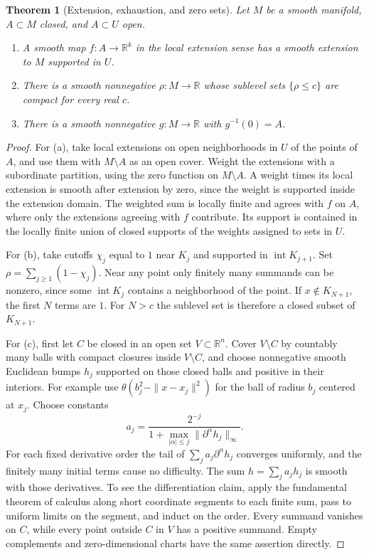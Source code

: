 \documentclass[11pt,oneside,openany]{book}
\newtheorem{theorem}{Theorem}[chapter]
\theoremstyle{definition}
\theoremstyle{remark}
\newcommand{\R}{\mathbb R}
\begin{document}
\begin{theorem}[Extension, exhaustion, and zero sets]\label{p104:M01.07}
Let \(M\) be a smooth manifold, \(A\subset M\) closed, and
\(A\subset U\) open.
\begin{enumerate}[label=\textup{(\alph*)}]
\item A smooth map \(f:A\to\R^k\) in the local extension sense has
  a smooth extension to \(M\) supported in \(U\).
\item There is a smooth nonnegative \(\rho:M\to\R\) whose sublevel
  sets \(\{\rho\leq c\}\) are compact for every real \(c\).
\item There is a smooth nonnegative \(g:M\to\R\) with
  \(g^{-1}(0)=A\).
\end{enumerate}
\end{theorem}

\begin{proof}
For (a), take local extensions on open neighborhoods in \(U\)
of the points of \(A\), and use them with \(M\setminus A\) as an
open cover. Weight the extensions with a subordinate partition,
using the zero function on \(M\setminus A\). A weight times its
local extension is smooth after extension by zero, since the
weight is supported inside the extension domain. The weighted
sum is locally finite and agrees with \(f\) on \(A\), where only
the extensions agreeing with \(f\) contribute. Its support is
contained in the locally finite union of closed supports of the
weights assigned to sets in \(U\).

For (b), take cutoffs \(\chi_j\) equal to \(1\) near \(K_j\)
and supported in \(\operatorname{int}K_{j+1}\). Set
\(\rho=\sum_{j\geq1}(1-\chi_j)\). Near any point only finitely
many summands can be nonzero, since some
\(\operatorname{int}K_j\) contains a neighborhood of the point.
If \(x\notin K_{N+1}\), the first \(N\) terms are \(1\).
For \(N>c\) the sublevel set is therefore a closed subset of
\(K_{N+1}\).

For (c), first let \(C\) be closed in an open set
\(V\subset\R^n\). Cover \(V\setminus C\) by countably many balls
with compact closures inside \(V\setminus C\), and choose
nonnegative smooth Euclidean bumps \(h_j\) supported on those
closed balls and positive in their interiors. For example use
\(\theta(b_j^2-\|x-x_j\|^2)\) for the ball of radius \(b_j\)
centered at \(x_j\). Choose constants
\[
 a_j=\frac{2^{-j}}{1+
   \max_{|\alpha|\leq j}\|\partial^\alpha h_j\|_\infty}.
\]
For each fixed derivative order the tail of
\(\sum_j a_j\partial^\alpha h_j\) converges uniformly, and the
finitely many initial terms cause no difficulty. The sum
\(h=\sum_j a_jh_j\) is smooth with those derivatives. To see
the differentiation claim, apply the fundamental theorem of
calculus along short coordinate segments to each finite sum,
pass to uniform limits on the segment, and induct on the order.
Every summand vanishes on \(C\), while every point outside \(C\)
in \(V\) has a positive summand. Empty complements and
zero-dimensional charts have the same assertion directly.


\end{proof}
\end{document}
